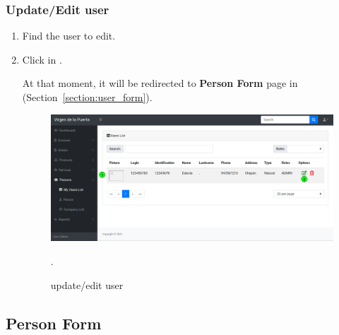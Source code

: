 \documentclass[a4paper,11pt]{refart}
\begin{document}
\subsubsection{Update/Edit user}
\begin{enumerate}
	\item Find the user to edit.
	\item Click in .
	\medskip
	\begin{leftbar}
		At that moment, it will be redirected to \textbf{Person Form} page in (Section~\ref{section:user_form}).
	\end{leftbar}
	\begin{figure}[H]\centering
		\includegraphics[width=\textwidth]{images/user_list-update.png}
		\caption{update/edit user}
		\label{fig:user_list-update.png}.
	\end{figure}
\end{enumerate}

\subsection{Person Form}\label{section:person_form}
\end{document}
